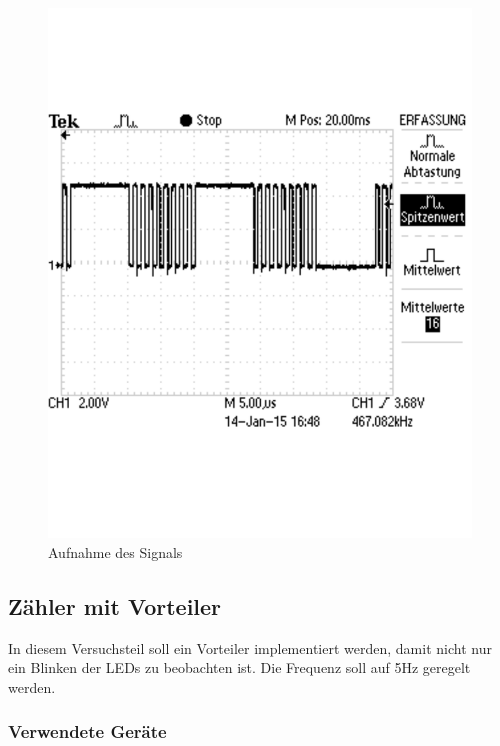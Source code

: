 \documentclass[12pt,a4paper]{article}
\begin{document}
\begin{figure}[H] 
  \centering 	
    \includegraphics[trim = 0mm 50mm 0mm 50mm, clip, scale = 0.4]{TEK0014.pdf}
  	\caption[Aufnahme des Signals]{Aufnahme des Signals} 
  \label{fig:o_1}
\end{figure}

\subsection{Zähler mit Vorteiler}

In diesem Versuchsteil soll ein Vorteiler implementiert werden, damit nicht nur ein Blinken der LEDs zu beobachten ist. Die Frequenz soll auf 5Hz geregelt werden.

\subsubsection*{Verwendete Geräte}
\end{document}
